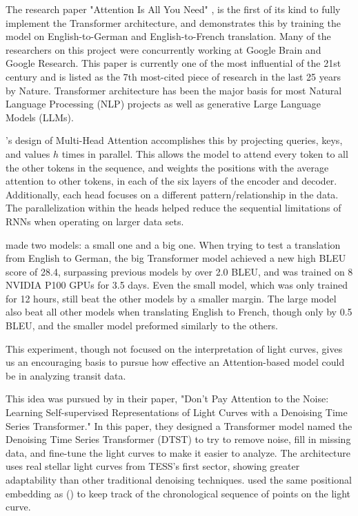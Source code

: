 \documentclass[letterpaper]{article} %
\begin{document}
The research paper "Attention Is All You Need" \cite{vaswani2017attentionneed}, is the first of its kind to fully implement the Transformer architecture, and demonstrates this by training the model on English-to-German and English-to-French translation. Many of the researchers on this project were concurrently working at Google Brain and Google Research. This paper is currently one of the most influential of the 21st century and is listed as the 7th most-cited piece of research in the last 25 years by Nature. Transformer architecture has been the major basis for most Natural Language Processing (NLP) projects as well as generative Large Language Models (LLMs).

\citeauthor{vaswani2017attentionneed}'s design of Multi-Head Attention accomplishes this by projecting queries, keys, and values $h$ times in parallel. This allows the model to attend every token to all the other tokens in the sequence, and weights the positions with the average attention to other tokens, in each of the six layers of the encoder and decoder. Additionally, each head focuses on a different pattern/relationship in the data. The parallelization within the heads helped reduce the sequential limitations of RNNs when operating on larger data sets.

\citeauthor{vaswani2017attentionneed} made two models: a small one and a big one. When trying to test a translation from English to German, the big Transformer model achieved a new high BLEU score of 28.4, surpassing previous models by over 2.0 BLEU, and was trained on 8 NVIDIA P100 GPUs for 3.5 days. Even the small model, which was only trained for 12 hours, still beat the other models by a smaller margin. The large model also beat all other models when translating English to French, though only by 0.5 BLEU, and the smaller model preformed similarly to the others.

This experiment, though not focused on the interpretation of light curves, gives us an encouraging basis to pursue how effective an Attention-based model could be in analyzing transit data.

This idea was pursued by \citeauthor{morvan2022dontpayattentionnoise} in their \citeyear{morvan2022dontpayattentionnoise} paper, "Don't Pay Attention to the Noise: Learning Self-supervised Representations of Light Curves with a Denoising Time Series Transformer." In this paper, they designed a Transformer model named the Denoising Time Series Transformer (DTST) to try to remove noise, fill in missing data, and fine-tune the light curves to make it easier to analyze. The architecture uses real stellar light curves from TESS's first sector, showing greater adaptability than other traditional denoising techniques. \citeauthor{morvan2022dontpayattentionnoise} used the same positional embedding as \citeauthor{vaswani2017attentionneed} (\citeyear{vaswani2017attentionneed}) to keep track of the chronological sequence of points on the light curve.
\end{document}
